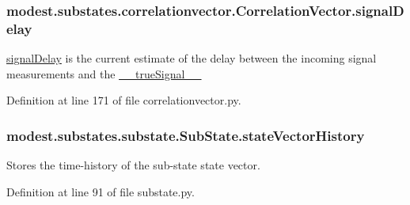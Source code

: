 \subsubsection[{\texorpdfstring{signal\+Delay}{signalDelay}}]{\setlength{\rightskip}{0pt plus 5cm}modest.\+substates.\+correlationvector.\+Correlation\+Vector.\+signal\+Delay}\hypertarget{classmodest_1_1substates_1_1correlationvector_1_1CorrelationVector_aa1565b9972d60149f335e3b923cac371}{}\label{classmodest_1_1substates_1_1correlationvector_1_1CorrelationVector_aa1565b9972d60149f335e3b923cac371}


\hyperlink{classmodest_1_1substates_1_1correlationvector_1_1CorrelationVector_aa1565b9972d60149f335e3b923cac371}{signal\+Delay} is the current estimate of the delay between the incoming signal measurements and the \hyperlink{classmodest_1_1substates_1_1correlationvector_1_1CorrelationVector_af2f52cea1c695f36dd100f529c322e94}{\+\_\+\+\_\+true\+Signal\+\_\+\+\_\+} 



Definition at line 171 of file correlationvector.\+py.

\subsubsection[{\texorpdfstring{state\+Vector\+History}{stateVectorHistory}}]{\setlength{\rightskip}{0pt plus 5cm}modest.\+substates.\+substate.\+Sub\+State.\+state\+Vector\+History\hspace{0.3cm}{\ttfamily [inherited]}}\hypertarget{classmodest_1_1substates_1_1substate_1_1SubState_a38c12c9d0899bc1161f3502b584517a2}{}\label{classmodest_1_1substates_1_1substate_1_1SubState_a38c12c9d0899bc1161f3502b584517a2}


Stores the time-\/history of the sub-\/state state vector. 



Definition at line 91 of file substate.\+py.

